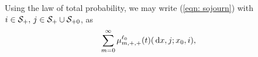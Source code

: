Using the law of total probability, we may write (\ref{eqn: sojourn}) with \(i\in\mathcal{S}_+,\,j\in\mathcal{S}_+\cup\mathcal{S}_{+0}\), as 
\begin{align}
	\label{eqn: sojourn partition}&\sum_{m=0}^\infty \mu_{m,+,+}^{\ell_0}(t)(\, \mathrm{d} x,j;x_0,i),
\end{align}
